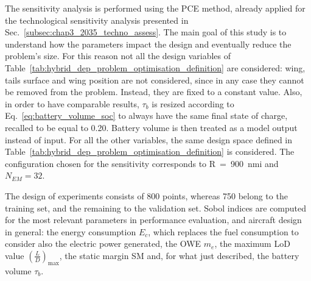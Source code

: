The sensitivity analysis is performed using the PCE method, already applied for the technological sensitivity analysis presented in Sec.~\ref{subsec:chap3_2035_techno_assess}.
The main goal of this study is to understand how the parameters impact the design and eventually reduce the problem's size. 
For this reason not all the design variables of Table~\ref{tab:hybrid_dep_problem_optimisation_definition} are considered: wing, tails surface and wing position are not considered, since in any case they cannot be removed from the problem.
Instead, they are fixed to a constant value.  
Also, in order to have comparable results, $\tau_{b}$ is resized according to Eq.~\eqref{eq:battery_volume_soc} to always have the same final state of charge, recalled to be equal to 0.20. 
Battery volume is then treated as a model output instead of input. 
For all the other variables, the same design space defined in Table~\ref{tab:hybrid_dep_problem_optimisation_definition} is considered.
The configuration chosen for the sensitivity corresponds to R~=~900~nmi and $N_{EM}=32$.  

The design of experiments consists of 800 points, whereas 750 belong to the training set, and the remaining to the validation set. 
Sobol indices are computed for the most relevant parameters in performance evaluation, and aircraft design in general: the energy consumption $E_c$, which replaces the fuel consumption to consider also the electric power generated, the OWE $m_e$, the maximum LoD value $\left(\frac{L}{D}\right)_{\max}$, the static margin SM and, for what just described, the battery volume $\tau_{b}$.

